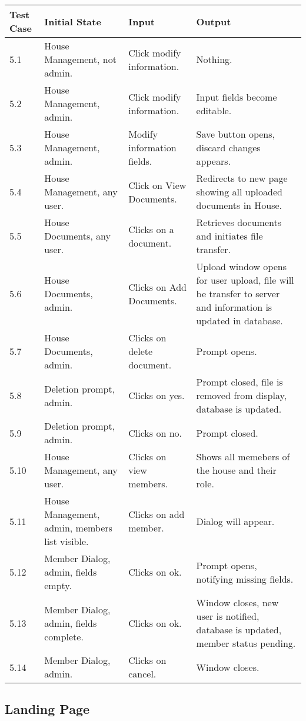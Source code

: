 \documentclass[12pt]{article}
\begin{document}
\begin{longtable}{|p{2cm}|p{3cm}|p{5cm}|p{5cm}|}
\hline
\textbf{Test Case}  & \textbf{Initial State} & \textbf{Input} & \textbf{Output} \\ \hline
5.1 & House Management, not admin. & Click modify information. & Nothing.\\ 
\hline
5.2 & House Management, admin. & Click modify information. & Input fields become editable. \\
\hline
5.3 & House Management, admin. & Modify information fields. & Save button opens, discard changes appears. \\
\hline
5.4 & House Management, any user. & Click on View Documents. & Redirects to new page showing all uploaded documents in House. \\
\hline
5.5 & House Documents, any user. & Clicks on a document. & Retrieves documents and initiates file transfer.\\
\hline
5.6 & House Documents, admin. & Clicks on Add Documents. & Upload window opens for user upload, file will be transfer to server and information is updated in database.\\
\hline
5.7 & House Documents, admin. & Clicks on delete document. & Prompt opens.\\
\hline
5.8 & Deletion prompt, admin. & Clicks on yes. & Prompt closed, file is removed from display, database is updated.\\
\hline
5.9 & Deletion prompt, admin. & Clicks on no. & Prompt closed.\\
\hline
5.10 & House Management, any user. & Clicks on view members. & Shows all memebers of the house and their role.\\
\hline
5.11 & House Management, admin, members list visible. & Clicks on add member. & Dialog will appear.\\
\hline
5.12 & Member Dialog, admin, fields empty. & Clicks on ok. & Prompt opens, notifying missing fields. \\
\hline
5.13 & Member Dialog, admin, fields complete. & Clicks on ok. & Window closes, new user is notified, database is updated, member status pending.\\
\hline
5.14 & Member Dialog, admin. & Clicks on cancel. & Window closes.\\
\hline
\end{longtable}


\subsection{Landing Page}
\end{document}
